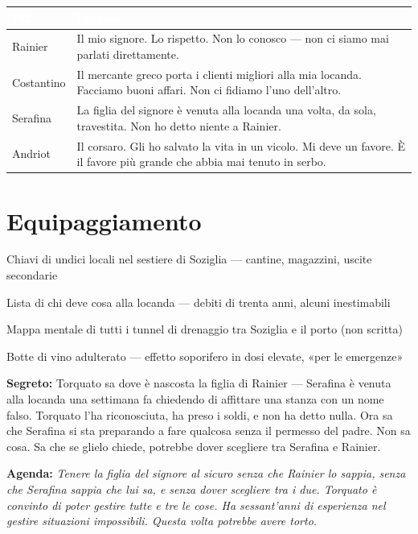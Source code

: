 \begin{table}[h]
\centering\renewcommand{\arraystretch}{1.4}
\begin{tabularx}{\linewidth}{@{}L{2.6cm} X@{}}
  \toprule{}
  \textcolor{white}{\textbf{PG}} & \textcolor{white}{\textbf{Legame}} \\
  \midrule
  Rainier & Il mio signore. Lo rispetto. Non lo conosco — non ci siamo mai parlati direttamente. \\
  Costantino & Il mercante greco porta i clienti migliori alla mia locanda. Facciamo buoni affari. Non ci fidiamo l'uno dell'altro. \\
  Serafina & La figlia del signore è venuta alla locanda una volta, da sola, travestita. Non ho detto niente a Rainier. \\
  Andriot & Il corsaro. Gli ho salvato la vita in un vicolo. Mi deve un favore. È il favore più grande che abbia mai tenuto in serbo. \\
  \bottomrule
\end{tabularx}
\end{table}

\section*{Equipaggiamento}
\begin{goldlist}
  \item Chiavi di undici locali nel sestiere di Soziglia — cantine, magazzini, uscite secondarie
  \item Lista di chi deve cosa alla locanda — debiti di trenta anni, alcuni inestimabili
  \item Mappa mentale di tutti i tunnel di drenaggio tra Soziglia e il porto (non scritta)
  \item Botte di vino adulterato — effetto soporifero in dosi elevate, «per le emergenze»
\end{goldlist}


\begin{secretbox}
  \textbf{Segreto:} Torquato sa dove è nascosta la figlia di Rainier — Serafina
  è venuta alla locanda una settimana fa chiedendo di affittare una stanza
  con un nome falso. Torquato l'ha riconosciuta, ha preso i soldi, e non ha
  detto nulla. Ora sa che Serafina si sta preparando a fare qualcosa senza
  il permesso del padre. Non sa cosa. Sa che se glielo chiede, potrebbe
  dover scegliere tra Serafina e Rainier.

  \medskip\noindent\textcolor{SecretRed}{\textbf{Agenda:}}
  \textit{Tenere la figlia del signore al sicuro senza che Rainier lo sappia,
  senza che Serafina sappia che lui sa, e senza dover scegliere tra i due.
  Torquato è convinto di poter gestire tutte e tre le cose. Ha sessant'anni
  di esperienza nel gestire situazioni impossibili. Questa volta potrebbe
  avere torto.}
\end{secretbox}
